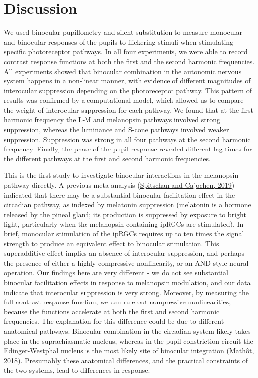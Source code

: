 \documentclass[
]{article}
\begin{document}
\hypertarget{discussion}{%
\section{Discussion}\label{discussion}}

We used binocular pupillometry and silent substitution to measure monocular and binocular responses of the pupils to flickering stimuli when stimulating specific photoreceptor pathways. In all four experiments, we were able to record contrast response functions at both the first and the second harmonic frequencies. All experiments showed that binocular combination in the autonomic nervous system happens in a non-linear manner, with evidence of different magnitudes of interocular suppression depending on the photoreceptor pathway. This pattern of results was confirmed by a computational model, which allowed us to compare the weight of interocular suppression for each pathway. We found that at the first harmonic frequency the L-M and melanopsin pathways involved strong suppression, whereas the luminance and S-cone pathways involved weaker suppression. Suppression was strong in all four pathways at the second harmonic frequency. Finally, the phase of the pupil response revealed different lag times for the different pathways at the first and second harmonic frequencies.

This is the first study to investigate binocular interactions in the melanopsin pathway directly. A previous meta-analysis (\protect\hyperlink{ref-Spitschan2019}{Spitschan and Cajochen, 2019}) indicated that there may be a substantial binocular facilitation effect in the circadian pathway, as indexed by melatonin suppression (melatonin is a hormone released by the pineal gland; its production is suppressed by exposure to bright light, particularly when the melanopsin-containing ipRGCs are stimulated). In brief, monocular stimulation of the ipRGCs requires up to ten times the signal strength to produce an equivalent effect to binocular stimulation. This superadditive effect implies an absence of interocular suppression, and perhaps the presence of either a highly compressive nonlinearity, or an AND-style neural operation. Our findings here are very different - we do not see substantial binocular facilitation effects in response to melanopsin modulation, and our data indicate that interocular suppression is very strong. Moreover, by measuring the full contrast response function, we can rule out compressive nonlinearities, because the functions accelerate at both the first and second harmonic frequencies. The explanation for this difference could be due to different anatomical pathways. Binocular combination in the circadian system likely takes place in the suprachiasmatic nucleus, whereas in the pupil constriction circuit the Edinger-Westphal nucleus is the most likely site of binocular integration (\protect\hyperlink{ref-Mathot2018}{Mathôt, 2018}). Presumably these anatomical differences, and the practical constraints of the two systems, lead to differences in response.
\end{document}
